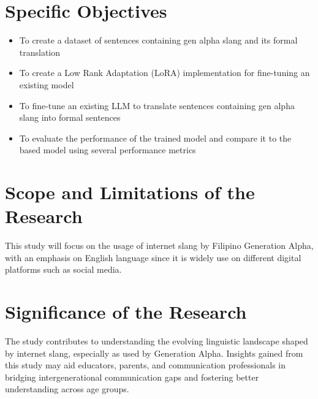 \section{Specific Objectives}
\label{sec:specific_objectives}
\begin{itemize}
	\item To create a dataset of sentences containing gen alpha slang and its formal translation
	\item To create a Low Rank Adaptation (LoRA) implementation for fine-tuning an existing model
	\item To fine-tune an existing LLM to translate sentences containing gen alpha slang into formal sentences
	\item To evaluate the performance of the trained model and compare it to the based model using several performance metrics
\end{itemize}

\section{Scope and Limitations of the Research}
\label{sec:scope}
This study will focus on the usage of internet slang by Filipino Generation Alpha, with an emphasis on English language since it is widely use on different digital platforms such as social media.

\section{Significance of the Research}
\label{sec:significance}
The study contributes to understanding the evolving linguistic landscape shaped by internet slang, especially as used by Generation Alpha. Insights gained from this study may aid educators, parents, and communication professionals in bridging intergenerational communication gaps and fostering better understanding across age groups.